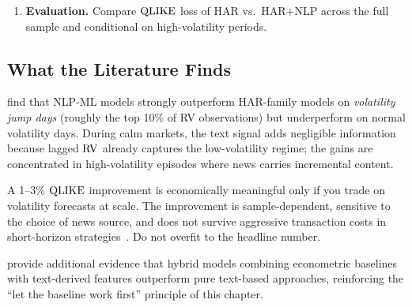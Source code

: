 \begin{enumerate}
        \begin{projectconnection}
        At Goldman Sachs you may have access to proprietary news feeds
        or internal research sentiment.  Public NLP signals show modest
        and conditional improvements---primarily on volatility jump
        days---but a curated internal signal could do better.  More
        importantly, this equation shows the general template for
        augmenting HAR with any exogenous feature: just add it as an
        extra regressor and test whether $\gamma \neq 0$.
        \end{projectconnection}

  \item \textbf{Evaluation.}  Compare $\operatorname{QLIKE}$ loss of HAR vs.\
        HAR$+$NLP across the full sample and conditional on high-volatility
        periods.
\end{enumerate}

\subsection{What the Literature Finds}

\citet{RahimikiaZohrenPoon2021NLP} find that NLP-ML models
strongly outperform HAR-family models on \emph{volatility jump days}
(roughly the top 10\% of RV observations) but underperform on normal
volatility days.  During calm markets, the text signal adds
negligible information because lagged $\operatorname{RV}$ already captures the
low-volatility regime; the gains are concentrated in high-volatility
episodes where news carries incremental content.

\begin{warning}
A 1--3\% $\operatorname{QLIKE}$ improvement is economically meaningful only if you
trade on volatility forecasts at scale.  The improvement is
sample-dependent, sensitive to the choice of news source, and does not
survive aggressive transaction costs in short-horizon
strategies~\citep{RahimikiaZohrenPoon2021NLP}.  Do not overfit to the
headline number.
\end{warning}

\citet{RahimikiaPoon2020} provide additional evidence that hybrid models
combining econometric baselines with text-derived features outperform
pure text-based approaches, reinforcing the ``let the baseline work
first'' principle of this chapter.


